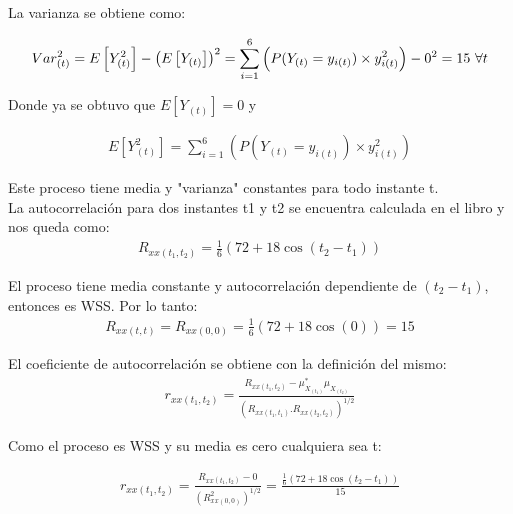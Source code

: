 La varianza se obtiene como:

\begin{equation*}
\begin{gathered}
	Var^{2}_{(t)} = E\left[Y_{(t)}^{2}\right]- \left(E\left[Y_{(t)}\right]\right)^{2}  = \sum_{i=1}^{6}\left( P(Y_{(t)} = y_{i(t)}) \times y_{i(t)}^{2}\right) - 0^2 = 15 $   $ \forall t 
\end{gathered}
\end{equation*}

Donde ya se obtuvo que $E\left[Y_{(t)}\right] = 0$ y 

\begin{equation*}
\begin{gathered}
	E\left[Y_{(t)}^{2}\right] = \sum_{i=1}^{6}\left( P(Y_{(t)} = y_{i(t)}) \times y_{i(t)}^{2}\right) 
\end{gathered}
\end{equation*}

Este proceso tiene media y "varianza" constantes para todo instante t.\\

La autocorrelación para dos instantes t1 y t2 se encuentra calculada en el libro y nos queda como:
\begin{equation*}
\begin{gathered}
	R_{xx(t_1,t_2)} = \frac{1}{6}\left(72+ 18 \cos(t_2 - t_1)\right)
\end{gathered}
\end{equation*}

El proceso tiene media constante y autocorrelación dependiente de $(t_2 - t_1)$, entonces es WSS. Por lo tanto:
\begin{equation*}
\begin{gathered}
	R_{xx(t,t)} = R_{xx(0,0)} = \frac{1}{6}\left(72+ 18 \cos(0)\right) = 15
\end{gathered}
\end{equation*}

El coeficiente de autocorrelación se obtiene con la definición del mismo:
\begin{equation*}
\begin{gathered}
	r_{xx(t_1,t_2)} = \frac{R_{xx(t_1,t_2)}-\mu_{X_{(t_1)}}^{*} \mu_{X_{(t_2)}}}{\left(R_{xx(t_1,t_1)}.R_{xx(t_2,t_2)}\right)^{1/2}} 
\end{gathered}
\end{equation*}

Como el proceso es WSS y su media es cero cualquiera sea t:

\begin{equation*}
\begin{gathered}
	r_{xx(t_1,t_2)} = \frac{R_{xx(t_1,t_2)}-0}{(R_{xx(0,0)}^2)^{1/2}} = \frac{\frac{1}{6}\left(72+ 18 \cos(t_2 - t_1)\right)}{15}
\end{gathered}
\end{equation*}


